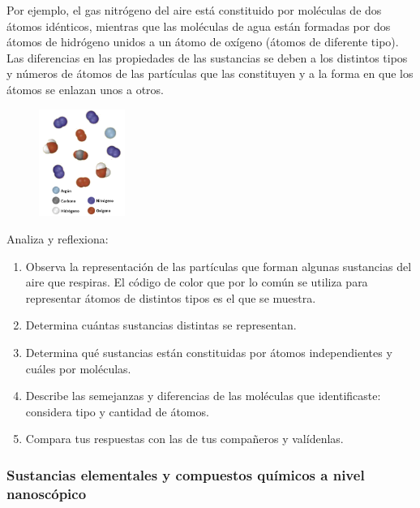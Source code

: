 \documentclass[11pt]{book}
\begin{document}
Por ejemplo, el gas nitrógeno del aire está constituido por moléculas de dos átomos
idénticos, mientras que las moléculas de agua están formadas por dos átomos de
hidrógeno unidos a un átomo de oxígeno (átomos de diferente tipo).
Las diferencias en las propiedades de las sustancias se deben a los distintos tipos
y números de átomos de las partículas que las constituyen y a la forma en que los
átomos se enlazan unos a otros.\\

\begin{boxK}
  \begin{figure}
    \centering
    \includegraphics[width=0.25\textwidth]{atomos02.png}
    \label{fig:atomos02}
  \end{figure}
  Analiza y reflexiona:\\
  \begin{enumerate}
    \item Observa la representación de las partículas que
          forman algunas sustancias del aire que respiras.
          El código de color que por lo común se utiliza
          para representar átomos de distintos tipos es el
          que se muestra.
    \item Determina cuántas sustancias distintas se representan.
    \item Determina qué sustancias están constituidas por átomos independientes y cuáles por moléculas.
    \item Describe las semejanzas y diferencias de las moléculas que identificaste: considera tipo y cantidad de átomos.
    \item Compara tus respuestas con las de tus compañeros y valídenlas.
  \end{enumerate}%
\end{boxK}

\subsubsection{Sustancias elementales y compuestos químicos a nivel nanoscópico}
\end{document}
